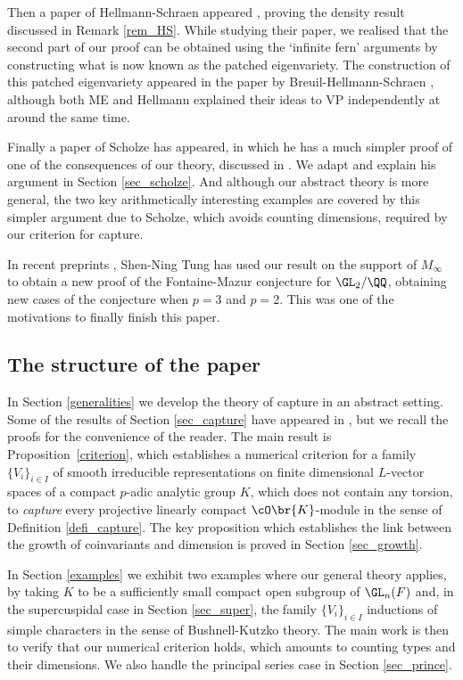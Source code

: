 Then a paper of Hellmann-Schraen appeared \cite{HS}, proving the density result
discussed in Remark \ref{rem_HS}. While studying their paper, we realised that the second part of our proof
can be obtained using the `infinite fern' arguments by constructing what is now known as the patched
eigenvariety. The construction of this patched eigenvariety appeared in the paper by
Breuil-Hellmann-Schraen \cite{BHS}, although both ME and Hellmann explained their ideas
to VP independently at around the same time.

Finally a paper of Scholze \cite{scholze} has appeared, in which he has a much simpler proof of one of the consequences of our theory, discussed in \cite[3.3.2]{matt_icm}. We adapt and explain his argument in Section \ref{sec_scholze}. And although our abstract theory is more general, the two key arithmetically interesting examples are covered by this simpler argument due to Scholze, which avoids counting dimensions, required by our criterion for capture.

In recent preprints \cite{shen-ning}, \cite{shen-ning2} Shen-Ning Tung has used our result on the support
of $M_{\infty}$ to obtain a new proof of the Fontaine-Mazur conjecture for $\GL_2/\QQ$,
obtaining new cases of the conjecture when $p=3$ and $p=2$. This was one of the motivations to finally finish this paper.

\subsection{The structure of the paper} In Section \ref{generalities} we develop the theory of capture in
an abstract setting. Some of the results of Section \ref{sec_capture} have appeared in \cite[\S 2.4]{CDP}, but
we recall the proofs for the convenience of the reader. The main result is \hbox{Proposition \ref{criterion}},
which establishes a numerical criterion for a family $\{V_i\}_{i\in I}$ of smooth irreducible representations on finite
dimensional $L$-vector spaces of a compact $p$-adic analytic group $K$, which does not contain any torsion, to \textit{capture} every projective linearly compact $\cO\br{K}$-module in the sense of
Definition \ref{defi_capture}. The key proposition which establishes the link between the
growth of coinvariants and dimension is proved in Section \ref{sec_growth}.

In Section \ref{examples} we exhibit two examples where our general theory applies, by taking $K$
to be a sufficiently small compact open subgroup of $\GL_n(F)$ and, in the supercuspidal case in Section \ref{sec_super}, the family $\{V_i\}_{i\in I}$ inductions of simple characters in the sense of Bushnell-Kutzko theory. The main
work is then to verify that our numerical criterion holds, which amounts to counting types and their dimensions. We also handle the principal series case in Section \ref{sec_prince}.

